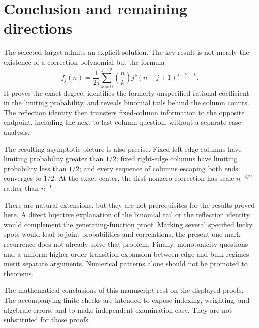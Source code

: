 \documentclass[11pt,letterpaper]{article}
\numberwithin{equation}{section}
\theoremstyle{definition}
\begin{document}
\section{Conclusion and remaining directions}
\label{sec:conclusion}
The selected target admits an explicit solution. The key result is not
merely the existence of a correction polynomial but the formula
\[
 f_j(n)=\frac1{2j}\sum_{k=0}^{j-2}\binom nk j^k(n-j+1)^{j-2-k}.
\]
It proves the exact degree, identifies the formerly unspecified rational
coefficient in the limiting probability, and reveals binomial tails behind
the column counts. The reflection identity then transfers fixed-column
information to the opposite endpoint, including the next-to-last-column
question, without a separate case analysis.

The resulting asymptotic picture is also precise. Fixed left-edge columns
have limiting probability greater than $1/2$; fixed right-edge columns have
limiting probability less than $1/2$; and every sequence of columns escaping
both ends converges to $1/2$. At the exact center, the first nonzero
correction has scale $n^{-3/2}$ rather than $n^{-1}$.

There are natural extensions, but they are not prerequisites for the
results proved here. A direct bijective explanation of the binomial tail
or the reflection identity would complement the generating-function proof.
Marking several specified lucky spots would lead to joint probabilities
and correlations; the present one-mark recurrence does not already solve
that problem. Finally, monotonicity questions and a uniform higher-order
transition expansion between edge and bulk regimes merit separate
arguments. Numerical patterns alone should not be promoted to theorems.

The mathematical conclusions of this manuscript rest on the displayed
proofs. The accompanying finite checks are intended to expose indexing,
weighting, and algebraic errors, and to make independent examination easy.
They are not substituted for those proofs.
\end{document}
